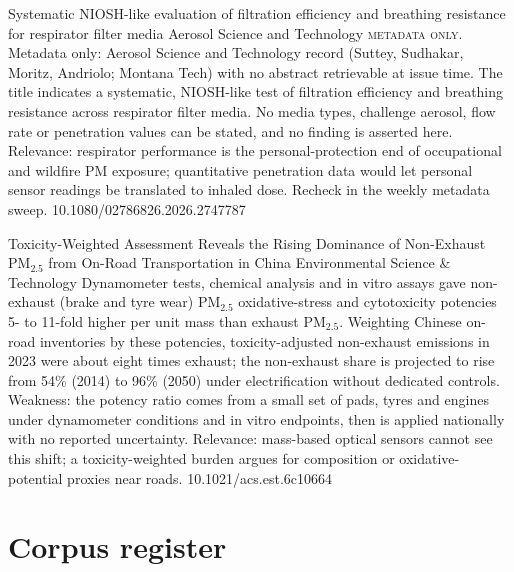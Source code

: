 \documentclass[10pt]{article}
\begin{document}
{Systematic NIOSH-like evaluation of filtration efficiency and breathing resistance for respirator filter media}
{Aerosol Science and Technology}
{\textsc{metadata only.} Metadata only: Aerosol Science and Technology record (Suttey, Sudhakar, Moritz, Andriolo; Montana Tech) with no abstract retrievable at issue time. The title indicates a systematic, NIOSH-like test of filtration efficiency and breathing resistance across respirator filter media. No media types, challenge aerosol, flow rate or penetration values can be stated, and no finding is asserted here. Relevance: respirator performance is the personal-protection end of occupational and wildfire PM exposure; quantitative penetration data would let personal sensor readings be translated to inhaled dose. Recheck in the weekly metadata sweep.}
{10.1080/02786826.2026.2747787}

\par{}\baselineskip{}\baselineskip
{}

{Toxicity-Weighted Assessment Reveals the Rising Dominance of Non-Exhaust PM$_{2.5}$ from On-Road Transportation in China}
{Environmental Science \& Technology}
{Dynamometer tests, chemical analysis and in vitro assays gave non-exhaust (brake and tyre wear) PM$_{2.5}$ oxidative-stress and cytotoxicity potencies 5- to 11-fold higher per unit mass than exhaust PM$_{2.5}$. Weighting Chinese on-road inventories by these potencies, toxicity-adjusted non-exhaust emissions in 2023 were about eight times exhaust; the non-exhaust share is projected to rise from 54\% (2014) to 96\% (2050) under electrification without dedicated controls. Weakness: the potency ratio comes from a small set of pads, tyres and engines under dynamometer conditions and in vitro endpoints, then is applied nationally with no reported uncertainty. Relevance: mass-based optical sensors cannot see this shift; a toxicity-weighted burden argues for composition or oxidative-potential proxies near roads.}
{10.1021/acs.est.6c10664}

\clearpage
\section*{\sffamily\bfseries\color{Deep}Corpus register}
\vspace{-1.5mm}{\color{Amber}\rule{\linewidth}{1.1pt}}\vspace{2.5mm}
\end{document}
